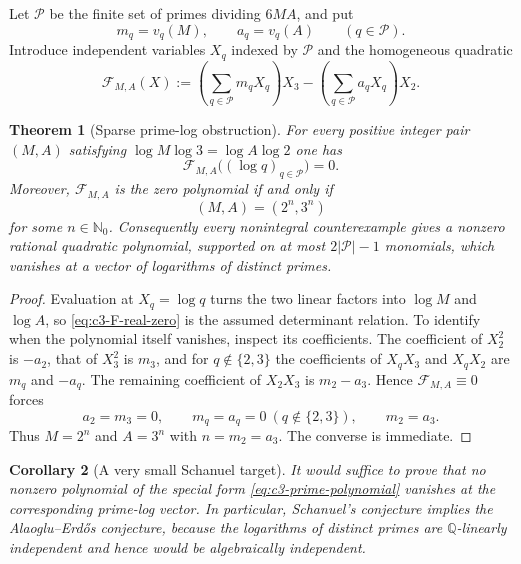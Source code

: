 \documentclass[11pt,oneside]{article}
\newtheorem{theorem}{Theorem}[section]
\newtheorem{corollary}[theorem]{Corollary}
\theoremstyle{definition}
\theoremstyle{remark}
\newcommand{\Nzero}{\mathbb N_0}
\newcommand{\Q}{\mathbb Q}
\begin{document}
Let $\mathcal P$ be the finite set of primes dividing $6MA$, and put
\[
  m_q=v_q(M),\qquad a_q=v_q(A)\qquad(q\in\mathcal P).
\]
Introduce independent variables $X_q$ indexed by $\mathcal P$ and the homogeneous quadratic
\begin{equation}\label{eq:c3-prime-polynomial}
 \mathcal F_{M,A}(X)
  :=\left(\sum_{q\in\mathcal P}m_qX_q\right)X_3
    -\left(\sum_{q\in\mathcal P}a_qX_q\right)X_2.
\end{equation}

\begin{theorem}[Sparse prime-log obstruction]\label{thm:c3-sparse-quadratic}
For every positive integer pair $(M,A)$ satisfying
$\log M\log3=\log A\log2$ one has
\begin{equation}\label{eq:c3-F-real-zero}
 \mathcal F_{M,A}\bigl((\log q)_{q\in\mathcal P}\bigr)=0.
\end{equation}
Moreover, $\mathcal F_{M,A}$ is the zero polynomial if and only if
\[
  (M,A)=(2^n,3^n)
\]
for some $n\in\Nzero$.  Consequently every nonintegral counterexample gives a
\emph{nonzero} rational quadratic polynomial, supported on at most
$2|\mathcal P|-1$ monomials, which vanishes at a vector of logarithms of distinct primes.
\end{theorem}

\begin{proof}
Evaluation at $X_q=\log q$ turns the two linear factors into $\log M$ and $\log A$, so
\eqref{eq:c3-F-real-zero} is the assumed determinant relation.  To identify when the
polynomial itself vanishes, inspect its coefficients.  The coefficient of $X_2^2$ is
$-a_2$, that of $X_3^2$ is $m_3$, and for $q\notin\{2,3\}$ the coefficients of
$X_qX_3$ and $X_qX_2$ are $m_q$ and $-a_q$.  The remaining coefficient of $X_2X_3$
is $m_2-a_3$.  Hence $\mathcal F_{M,A}\equiv0$ forces
\[
 a_2=m_3=0,\qquad m_q=a_q=0\ (q\notin\{2,3\}),\qquad m_2=a_3.
\]
Thus $M=2^n$ and $A=3^n$ with $n=m_2=a_3$.  The converse is immediate.
\end{proof}

\begin{corollary}[A very small Schanuel target]\label{cor:c3-schanuel-target}
It would suffice to prove that no nonzero polynomial of the special form
\eqref{eq:c3-prime-polynomial} vanishes at the corresponding prime-log vector.  In particular,
Schanuel's conjecture implies the Alaoglu--Erd\H{o}s conjecture, because the logarithms of
distinct primes are $\Q$-linearly independent and hence would be algebraically independent.
\end{corollary}
\end{document}
